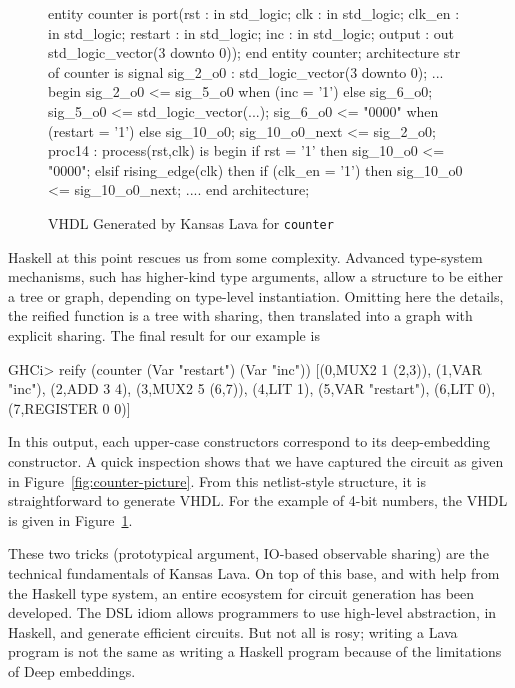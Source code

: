 \documentclass[11pt]{article}
\begin{document}
\begin{figure}[!t]
  \centering
   \begin{minipage}{0.6\textwidth}
     \centering
\footnotesize\begin{Code}[fontsize=\tiny]
entity counter is
  port(rst : in std_logic;
       clk : in std_logic;
       clk_en : in std_logic;
       restart : in std_logic;
       inc : in std_logic;
       output : out std_logic_vector(3 downto 0));
end entity counter;
architecture str of counter is
  signal sig_2_o0 : std_logic_vector(3 downto 0);
  ...
begin
  sig_2_o0 <= sig_5_o0 when (inc = '1')  else sig_6_o0;
  sig_5_o0 <= std_logic_vector(...);
  sig_6_o0 <= "0000" when (restart = '1') else sig_10_o0;
  sig_10_o0_next <= sig_2_o0;
  proc14 : process(rst,clk) is
  begin
    if rst = '1' then
      sig_10_o0 <= "0000";
    elsif rising_edge(clk) then
      if (clk_en = '1') then
        sig_10_o0 <= sig_10_o0_next;
  ....
end architecture;
\end{Code}
  \end{minipage}
  \caption{VHDL Generated by Kansas Lava for {\tt counter}}
  \label{fig:counter-VHDL}
\end{figure}

Haskell at this point rescues us from some complexity. Advanced type-system mechanisms, such has higher-kind type
arguments, allow a structure to be either a tree or graph, depending on type-level instantiation. 
Omitting here the details, the reified function is a tree with sharing,
then translated into a graph with explicit sharing. The final result for our example is
\begin{Code}
GHCi> reify (counter (Var "restart") (Var "inc"))
[(0,MUX2 1 (2,3)),
 (1,VAR "inc"),
 (2,ADD 3 4),
 (3,MUX2 5 (6,7)),
 (4,LIT 1),
 (5,VAR "restart"),
 (6,LIT 0),
 (7,REGISTER 0 0)]
\end{Code}
In this output, each upper-case constructors correspond to its deep-embedding constructor.
A quick inspection shows that we have captured the circuit as given in Figure~\ref{fig:counter-picture}.
From this netlist-style structure, it is straightforward to generate VHDL. For the example
of 4-bit numbers, the VHDL is given in Figure~\ref{fig:counter-VHDL}.

These two tricks (prototypical argument, IO-based observable sharing) are the technical fundamentals
of Kansas Lava. On top of this base, and with help from the Haskell type system, an entire ecosystem
for circuit generation has been developed. The DSL idiom allows programmers to use high-level 
abstraction, in Haskell, and generate efficient circuits. But not all is rosy; writing a Lava
program is not the same as writing a Haskell program because of the limitations of Deep
embeddings.
\end{document}
